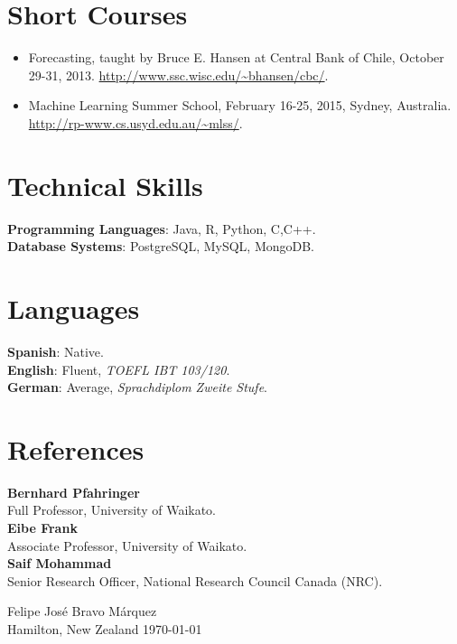 \documentclass[letterpaper]{article}
\begin{document}
  
  
\section{Short Courses}
\begin{itemize}
 \item Forecasting, taught by Bruce E. Hansen at Central Bank of Chile, October 29-31, 2013. \url{http://www.ssc.wisc.edu/~bhansen/cbc/}.
 \item Machine Learning Summer School, February 16-25, 2015, Sydney, Australia. \url{http://rp-www.cs.usyd.edu.au/~mlss/}.
 \end{itemize} 
 
 
 
 
 

\section{Technical Skills}
\begin{flushleft}
\textbf{Programming Languages}: Java, R, Python, C,C++. \\
\textbf{Database Systems}: PostgreSQL, MySQL, MongoDB.\\
\end{flushleft}

\section{Languages}
\begin{flushleft}
\textbf{Spanish}: Native.  \\
\textbf{English}: Fluent, \textit{TOEFL IBT 103/120}.   \\
\textbf{German}:  Average, \textit{Sprachdiplom Zweite Stufe}. \\ 
\end{flushleft}

\section{References}
\begin{flushleft}
\textbf{Bernhard Pfahringer} \\
Full Professor, University of Waikato. \\
\textbf{Eibe Frank} \\
Associate Professor, University of Waikato. \\
\textbf{Saif Mohammad}   \\
Senior Research Officer, National Research Council Canada (NRC). \\ 
\end{flushleft}


\vspace{\baselineskip}
\begin{flushright}
Felipe José Bravo Márquez\\
Hamilton, New Zealand \today
\end{flushright}
\end{document}
